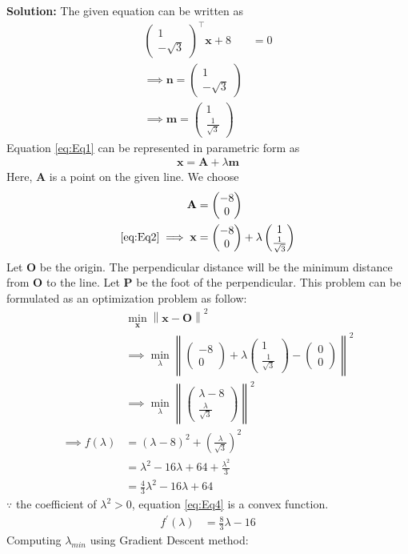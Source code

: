 \documentclass[12pt]{article}
\providecommand{\brak}[1]{\ensuremath{\left(#1\right)}}
\providecommand{\norm}[1]{\left\lVert#1\right\rVert}
\newcommand{\solution}{\noindent \textbf{Solution: }}
\newcommand{\myvec}[1]{\ensuremath{\begin{pmatrix}#1\end{pmatrix}}}
\let\vec\mathbf
\begin{document}
\begin{enumerate}
\solution 
The given equation can be written as
\begin{align}
	\label{eq:Eq1}
	\myvec{1 \\ -\sqrt{3}}^\top\vec{x}+8 &= 0 \\
	\implies \vec{n} = \myvec{1 \\ -\sqrt{3}} \\
	\implies \vec{m} = \myvec{1 \\ \frac{1}{\sqrt{3}}}
\end{align}
Equation \eqref{eq:Eq1} can be represented in parametric form as
\begin{align}
	\label{eq:Eq2}
	\vec{x} = \vec{A}+\lambda\vec{m}
\end{align}
Here, $\vec{A}$ is a point on the given line. We choose  
\begin{align}
	\vec{A} &= \myvec{-8 \\ 0}\\
	\label{eq:Eqx}
	\eqref{eq:Eq2} \implies \vec{x} &= \myvec{-8 \\ 0}+\lambda\myvec{1 \\ \frac{1}{\sqrt{3}}} 
\end{align}
Let $\vec{O}$ be the origin. The perpendicular distance will be the minimum distance from $\vec{O}$ to the line. Let $\vec{P}$ be the foot of the perpendicular. This problem can be formulated as an optimization problem as follow:
\begin{align}
	\label{eq:Eq3}
	&  \min_{\vec{x}} \norm{\vec{x}-\vec{O}}^2\\
	& \implies \min_{\lambda} \norm{ \myvec{-8 \\ 0}+\lambda\myvec{1 \\ \frac{1}{\sqrt{3}}} -\myvec{0 \\ 0}}^2\\
	& \implies \min_{\lambda} \norm{ \myvec{\lambda-8 \\ \frac{\lambda}{\sqrt{3}}}}^2 \\ 
	\implies f\brak{\lambda} &= \brak{\lambda-8}^2 + \brak{\frac{\lambda}{\sqrt{3}}}^2 \\ 
	&= \lambda^2-16\lambda+64+\frac{\lambda^2}{3}\\
	\label{eq:Eq4}
	&= \frac{4}{3}\lambda^2-16\lambda+64
\end{align}
$\because$ the coefficient of $\lambda^2> 0$, equation \eqref{eq:Eq4} is a convex function.
\begin{align}
	f^\prime\brak{\lambda} &= \frac{8}{3}\lambda - 16 
\end{align}	
Computing $\lambda_{min}$ using Gradient Descent method:

\end{enumerate}
\end{document}
